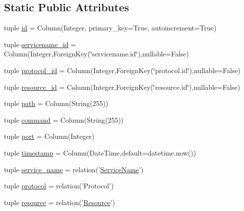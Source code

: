 \subsection*{\-Static \-Public \-Attributes}
\begin{DoxyCompactItemize}
\item 
tuple \hyperlink{classcyberweb_1_1model_1_1service_1_1_service_a2a0ae61b7f34259eb085f86165c6559e}{id} = \-Column(\-Integer, primary\-\_\-key=\-True, autoincrement=\-True)
\item 
tuple \hyperlink{classcyberweb_1_1model_1_1service_1_1_service_a58dbd9d5027c07f533cc6757cf15e114}{servicename\-\_\-id} = \-Column(\-Integer,\-Foreign\-Key(\char`\"{}servicename.\-id\char`\"{}),nullable=\-False)
\item 
tuple \hyperlink{classcyberweb_1_1model_1_1service_1_1_service_a626e86dd4565e5c6fec93d5f63dec908}{protocol\-\_\-id} = \-Column(\-Integer,\-Foreign\-Key(\char`\"{}protocol.\-id\char`\"{}),nullable=\-False)
\item 
tuple \hyperlink{classcyberweb_1_1model_1_1service_1_1_service_ac68ccdb64c3e76d8d063d94f8f6750d7}{resource\-\_\-id} = \-Column(\-Integer,\-Foreign\-Key(\char`\"{}resource.\-id\char`\"{}),nullable=\-False)
\item 
tuple \hyperlink{classcyberweb_1_1model_1_1service_1_1_service_ac2ab6ce82d9e144021f69b6f5fd8b07a}{path} = \-Column(\-String(255))
\item 
tuple \hyperlink{classcyberweb_1_1model_1_1service_1_1_service_a929b0afb18753373bf9844d1ed384109}{command} = \-Column(\-String(255))
\item 
tuple \hyperlink{classcyberweb_1_1model_1_1service_1_1_service_a1d1d5bc674d797ea8f975e0e75b17f5d}{port} = \-Column(\-Integer)
\item 
tuple \hyperlink{classcyberweb_1_1model_1_1service_1_1_service_aa637c5258fe09a8534f237413b2c561d}{timestamp} = \-Column(\-Date\-Time,default=datetime.\-now())
\item 
tuple \hyperlink{classcyberweb_1_1model_1_1service_1_1_service_a66f56f3a0e28e576c5ca1e59f6421052}{service\-\_\-name} = relation('\hyperlink{classcyberweb_1_1model_1_1service_1_1_service_name}{\-Service\-Name}')
\item 
tuple \hyperlink{classcyberweb_1_1model_1_1service_1_1_service_a0d567b079ca64716f103d668c16c9ac6}{protocol} = relation('\-Protocol')
\item 
tuple \hyperlink{classcyberweb_1_1model_1_1service_1_1_service_ad95508e8a312a2f5f62bbffa4194136b}{resource} = relation('\hyperlink{classcyberweb_1_1model_1_1resource_1_1_resource}{\-Resource}')
\end{DoxyCompactItemize}


